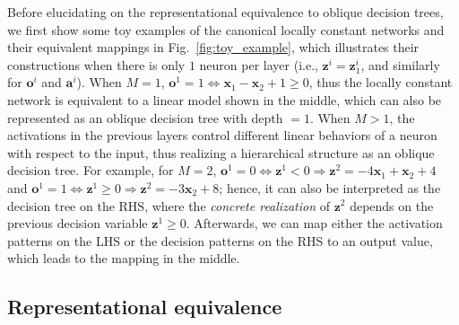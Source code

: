 \documentclass{article} \usepackage{iclr2020_conference,times}
\def\va{{\bm{a}}}
\def\vo{{\bm{o}}}
\def\vx{{\bm{x}}}
\def\vz{{\bm{z}}}
\begin{document}
Before elucidating on the representational equivalence to oblique decision trees, we first show some toy examples of the canonical locally constant networks and their equivalent mappings in Fig.~\ref{fig:toy_example}, which illustrates their constructions when there is only $1$ neuron per layer (i.e., $\vz^i = \vz^i_1$, and similarly for $\vo^i$ and $\va^i$). When $M=1$, $\vo^1 = 1 \Leftrightarrow \vx_1 - \vx_2 + 1 \geq 0$, thus the locally constant network is equivalent to a linear model shown in the middle, which can also be represented as an oblique decision tree with depth $=1$. When $M > 1$, the activations in the previous layers control different linear behaviors of a neuron with respect to the input, thus realizing a hierarchical structure as an oblique decision tree. For example, for $M=2$, $\vo^1 = 0 \Leftrightarrow \vz^1 < 0 \Rightarrow \vz^2 = -4\vx_1 + \vx_2 + 4$ and $\vo^1 = 1 \Leftrightarrow \vz^1 \geq 0 \Rightarrow \vz^2 = -3 \vx_2 + 8$; hence, it can also be interpreted as the decision tree on the RHS, where the \emph{concrete realization} of $\vz^2$ depends on the previous decision variable $\vz^1 \geq 0$. Afterwards, we can map either the activation patterns on the LHS or the decision patterns on the RHS to an output value, which leads to the mapping in the middle.  \vspace{-1mm}
\subsection{Representational equivalence}\label{sec:repr-theory}
\end{document}
